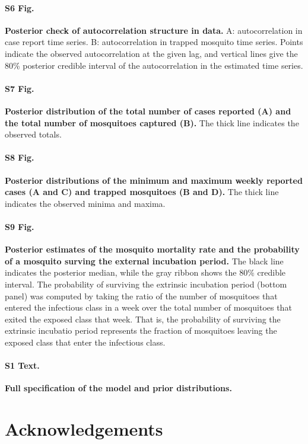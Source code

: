 \documentclass[10pt,letterpaper]{article}
\begin{document}
\paragraph*{S6 Fig.}
\label{S6_fig}
{\bf Posterior check of autocorrelation structure in data.} A: autocorrelation in case report time series. B: autocorrelation in trapped mosquito time series.  Points indicate the observed autocorrelation at the given lag, and vertical lines give the 80\% posterior credible interval of the autocorrelation in the estimated time series.

\paragraph*{S7 Fig.}
\label{S7_fig}
{\bf Posterior distribution of the total number of cases reported (A) and the total number of mosquitoes captured (B).}  The thick line indicates the observed totals.

\paragraph*{S8 Fig.}
\label{S8_fig}
{\bf Posterior distributions of the minimum and maximum weekly reported cases (A and C) and trapped mosquitoes (B and D).} The thick line indicates the observed minima and maxima.

\paragraph*{S9 Fig.}
\label{S9_fig}
{\bf Posterior estimates of the mosquito mortality rate and the probability of a mosquito surving the external incubation period.}  The black line indicates the posterior median, while the gray ribbon shows the 80$\%$ credible interval.  The probability of surviving the extrinsic incubation period (bottom panel) was computed by taking the ratio of the number of mosquitoes that entered the infectious class in a week over the total number of mosquitoes that exited the exposed class that week.  That is, the probability of surviving the extrinsic incubatio period represents the fraction of mosquitoes leaving the exposed class that enter the infectious class.

\paragraph*{S1 Text.}
\label{S1}
{\bf Full specification of the model and prior distributions.}


\section*{Acknowledgements}
\end{document}
